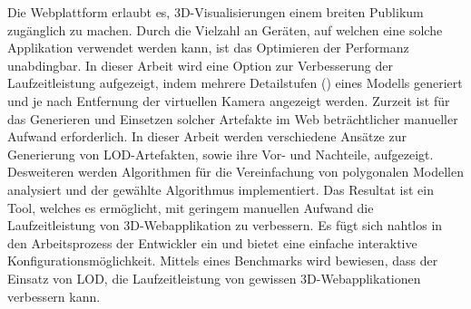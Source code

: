 Die Webplattform erlaubt es, 3D-Visualisierungen einem breiten Publikum zugänglich zu machen. Durch die Vielzahl an Geräten, auf welchen eine solche Applikation verwendet werden kann, ist das Optimieren der Performanz unabdingbar. In dieser Arbeit wird eine Option zur Verbesserung der Laufzeitleistung aufgezeigt, indem mehrere Detailstufen () eines Modells generiert und je nach Entfernung der virtuellen Kamera angezeigt werden. Zurzeit ist für das Generieren und Einsetzen solcher Artefakte im Web beträchtlicher manueller Aufwand erforderlich.
\bigbreak
In dieser Arbeit werden verschiedene Ansätze zur Generierung von LOD-Artefakten, sowie ihre Vor- und Nachteile, aufgezeigt.
Desweiteren werden Algorithmen für die Vereinfachung von polygonalen Modellen analysiert und der gewählte Algorithmus implementiert.
\bigbreak
Das Resultat ist ein Tool, welches es ermöglicht, mit geringem manuellen Aufwand die Laufzeitleistung von 3D-Webapplikation zu verbessern.
Es fügt sich nahtlos in den Arbeitsprozess der Entwickler ein und bietet eine einfache interaktive Konfigurationsmöglichkeit.
Mittels eines Benchmarks wird bewiesen, dass der Einsatz von LOD, die Laufzeitleistung von gewissen 3D-Webapplikationen verbessern kann.
